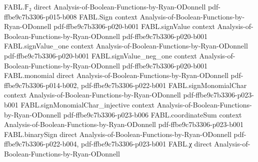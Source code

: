 \begin{theorem}
\label{FABL.widthThreeTseitin_complete}
\leanok
{}
\proofstep
  {FABL.𝔽₂}
  {direct}
  {Analysis-of-Boolean-Functions-by-Ryan-ODonnell}
  {pdf-ffbe9c7b3306-p015-b008}
\proofstep
  {FABL.Sign}
  {context}
  {Analysis-of-Boolean-Functions-by-Ryan-ODonnell}
  {pdf-ffbe9c7b3306-p020-b001}
\proofstep
  {FABL.signValue}
  {context}
  {Analysis-of-Boolean-Functions-by-Ryan-ODonnell}
  {pdf-ffbe9c7b3306-p020-b001}
\proofstep
  {FABL.signValue_one}
  {context}
  {Analysis-of-Boolean-Functions-by-Ryan-ODonnell}
  {pdf-ffbe9c7b3306-p020-b001}
\proofstep
  {FABL.signValue_neg_one}
  {context}
  {Analysis-of-Boolean-Functions-by-Ryan-ODonnell}
  {pdf-ffbe9c7b3306-p020-b001}
\proofstep
  {FABL.monomial}
  {direct}
  {Analysis-of-Boolean-Functions-by-Ryan-ODonnell}
  {pdf-ffbe9c7b3306-p014-b002,
    pdf-ffbe9c7b3306-p022-b001}
\proofstep
  {FABL.signMonomialChar}
  {context}
  {Analysis-of-Boolean-Functions-by-Ryan-ODonnell}
  {pdf-ffbe9c7b3306-p023-b001}
\proofstep
  {FABL.signMonomialChar_injective}
  {context}
  {Analysis-of-Boolean-Functions-by-Ryan-ODonnell}
  {pdf-ffbe9c7b3306-p023-b006}
\proofstep
  {FABL.coordinateSum}
  {context}
  {Analysis-of-Boolean-Functions-by-Ryan-ODonnell}
  {pdf-ffbe9c7b3306-p023-b001}
\proofstep
  {FABL.binarySign}
  {direct}
  {Analysis-of-Boolean-Functions-by-Ryan-ODonnell}
  {pdf-ffbe9c7b3306-p022-b004,
    pdf-ffbe9c7b3306-p023-b001}
\proofstep
  {FABL.χ}
  {direct}
  {Analysis-of-Boolean-Functions-by-Ryan-ODonnell}

\end{theorem}
